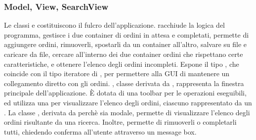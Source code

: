 \subsubsection{Model, View, SearchView} %
\label{ssub:model_view_searchview}
Le classi  e  costituiscono il fulcro dell'applicazione.  racchiude la logica del programma, gestisce i due container di ordini in attesa e completati, permette di aggiungere ordini, rimuoverli, spostarli da un container all'altro, salvare su file e caricare da file, cercare all'interno dei due container ordini che rispettano certe caratteristiche, e ottenere l'elenco degli ordini incompleti. Espone il tipo , che coincide con il tipo iteratore di , per permettere alla GUI di mantenere un collegamento diretto con gli ordini. , classe derivata da , rappresenta la finestra principale dell'applicazione. È dotata di una toolbar per le operazioni eseguibili, ed utilizza una  per visualizzare l'elenco degli ordini, ciascuno rappresentato da un . La classe , derivata da  perchè sia modale, permette di visualizzare l'elenco degli ordini risultante da una ricerca. Inoltre, permette di rimuoverli o completarli tutti, chiedendo conferma all'utente attraverso un message box.
